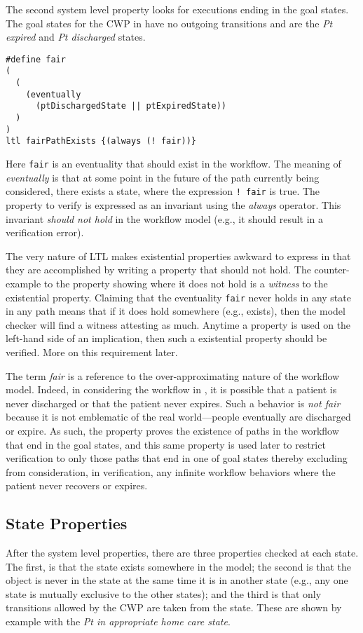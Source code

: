 The second system level property looks for executions ending in the goal states. The goal states for the CWP in  have no outgoing transitions and are the \emph{Pt expired} and \emph{Pt discharged} states.
%
{\small
\begin{lstlisting}[style=myPromela]
#define fair
(
  (
    (eventually 
      (ptDischargedState || ptExpiredState))
  )
)
ltl fairPathExists {(always (! fair))}
\end{lstlisting}
}
%
\noindent Here \texttt{fair} is an eventuality that should exist in the workflow. The meaning of \emph{eventually} is that at some point in the future of the path currently being considered, there exists a state, where the expression \texttt{! fair} is true. The property to verify is expressed as an invariant using the \emph{always} operator. This invariant \emph{should not hold} in the workflow model (e.g., it should result in a verification error). 

The very nature of LTL makes existential properties awkward to express in that they are accomplished by writing a property that should not hold. The counter-example to the property showing where it does not hold is a \emph{witness} to the existential property. Claiming that the eventuality \texttt{fair} never holds in any state in any path means that if it does hold somewhere (e.g., exists), then the model checker will find a witness attesting as much. Anytime a property is used on the left-hand side of an implication, then such a existential property should be verified. More on this requirement later.

The term \emph{fair} is a reference to the over-approximating nature of the workflow model. Indeed, in considering the workflow in , it is possible that a patient is never discharged or that the patient never expires. Such a behavior is \emph{not fair} because it is not emblematic of the real world---people eventually are discharged or expire. As such, the property proves the existence of paths in the workflow that end in the goal states, and this same property is used later to restrict verification to only those paths that end in one of goal states thereby excluding from consideration, in verification, any infinite workflow behaviors where the patient never recovers or expires.

\subsection{State Properties}
After the system level properties, there are three properties checked at each state. The first, is that the state exists somewhere in the model; the second is that the object is never in the state at the same time it is in another state (e.g., any one state is mutually exclusive to the other states); and the third is that only transitions allowed by the CWP are taken from the state. These are shown by example with the \emph{Pt in appropriate home care state}.

